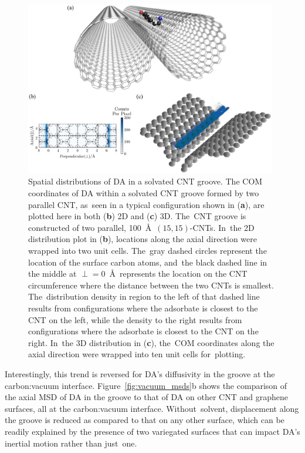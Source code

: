 \documentclass[molecules,article,accept,pdftex,moreauthors]{Definitions/mdpi}
\begin{document}
\begin{figure}[H]
    \includegraphics[width=0.98\textwidth]{MergedFigs/fig12/output.png}
    \caption{Spatial distributions of DA in a solvated CNT groove. The COM coordinates of DA within a solvated CNT groove formed by two parallel CNT, as~seen in a typical configuration shown in (\textbf{a}), are plotted here in both (\textbf{b}) 2D and (\textbf{c}) 3D. The~CNT groove is constructed of two parallel, 100~\AA\ $(15,15)$-CNTs. In~the 2D distribution plot in (\textbf{b}), locations along the axial direction were wrapped into two unit cells. The~gray dashed circles represent the location of the surface carbon atoms, and~the black dashed line in the middle at $\perp=0$~\AA\ represents the location on the CNT circumference where the distance between the two CNTs is smallest. The~distribution density in region to the left of that dashed line results from configurations where the adsorbate is closest to the CNT on the left, while the density to the right results from configurations where the adsorbate is closest to the CNT on the right. In~the 3D distribution in (\textbf{c}), the~COM coordinates along the axial direction were wrapped into ten unit cells for~plotting. }
    \label{fig:Defects_groove_lateral}
\end{figure}


Interestingly, this trend is reversed for DA's diffusivity in the groove at the carbon:vacuum interface. Figure~\ref{fig:vacuum_msds}b shows the comparison of the axial MSD of DA in the groove to that of DA on other CNT and graphene surfaces, all at the carbon:vacuum interface. Without~solvent, displacement along the groove is reduced as compared to that on any other surface, which can be readily explained by the presence of two variegated surfaces that can impact DA's inertial motion rather than just~one.
\end{document}

